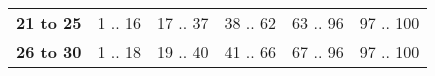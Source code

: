 \documentclass[oneside]{book}
\begin{document}
\begin{table}[h]
\begin{tabular}{lccccc}
\rowcolor[HTML]{EFEFEF} 
\textbf{21 to 25}                          & {\color[HTML]{333333} 1 .. 16}                            & 17 .. 37                           & 38 .. 62                                               & 63 .. 96                                               & 97 .. 100                                              \\
\rowcolor[HTML]{FFFFFF} 
\textbf{26 to 30}                          & {\color[HTML]{333333} 1 .. 18}                            & 19 .. 40                           & 41 .. 66                                               & 67 .. 96                                               & 97 .. 100                                             
\end{tabular}
\end{table}

\newpage
\end{document}
